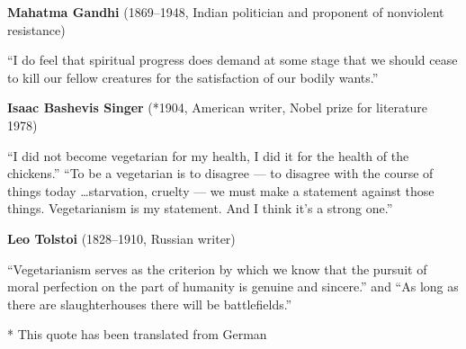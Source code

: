 \documentclass[../main.tex]{subfiles}
\begin{document}
\vspace{5mm}
\noindent \textbf{Mahatma Gandhi} (1869--1948, Indian politician and proponent of nonviolent resistance)

\noindent ``I do feel that spiritual progress does demand at some stage that we should cease to kill our fellow creatures for the satisfaction of our bodily wants.''

\vspace{5mm}
\noindent \textbf{Isaac Bashevis Singer} (*1904, American writer, Nobel prize for literature 1978)

\noindent ``I did not become vegetarian for my health, I did it for the health of the chickens.'' ``To be a vegetarian is to disagree --- to disagree with the course of things today \ldots starvation, cruelty --- we must make a statement against those things. Vegetarianism is my statement. And I think it's a strong one.''

\vspace{5mm}
\noindent \textbf{Leo Tolstoi} (1828--1910, Russian writer)

\vspace{5mm}
\noindent ``Vegetarianism serves as the criterion by which we know that the pursuit of moral perfection on the part of humanity is genuine and sincere.'' and
``As long as there are slaughterhouses there will be battlefields.''

\footnotesize{* This quote has been translated from German}
\end{document}
